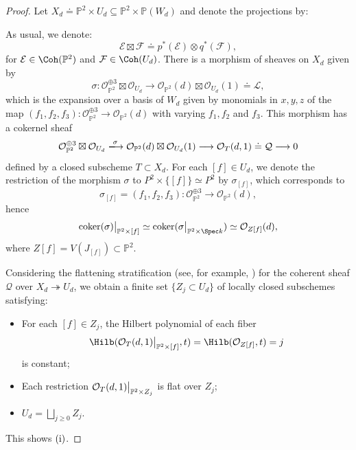 \documentclass[11pt]{amsart} %
\newcommand\restr[2]{{%
  \left.\kern-\nulldelimiterspace %
  #1 %
  \vphantom{\big|} %
  \right|_{#2} %
}}
\newcommand{\lar}{\longrightarrow}
\theoremstyle{definition}
\def\coker{\mbox{\rm coker}}
\begin{document}
\begin{proof}
Let $X_d \doteq \mathbb{P}^2 \times U_d \subseteq \mathbb{P}^2 \times \mathbb{P}(W_d)$ and denote the projections by:
\begin{center}
\end{center}
As usual, we denote:
$$
\mathcal{E} \boxtimes \mathcal{F} \doteq p^*( \mathcal{E}) \otimes q^*( \mathcal{F} ),
$$
for $\mathcal{E} \in \Coh(\mathbb{P}^2)$ and $\mathcal{F} \in \Coh(U_d)$. There is a morphism of sheaves on $X_d$ given by
$$
\sigma : \mathcal{O}_{\mathbb{P}^2}^{\oplus 3} \boxtimes \mathcal{O}_{U_d} \rightarrow \mathcal{O}_{\mathbb{P}^2}(d) \boxtimes \mathcal{O}_{U_d}(1) \doteq \mathcal{L},
$$
which is the expansion over a basis of $W_d$ given by monomials in $x,y,z$ of the map 
$
(f_1, f_2, f_3): \mathcal{O}_{\mathbb{P}^2}^{\oplus 3} \lar \mathcal{O}_{\mathbb{P}^2}(d)
$ with varying $f_1, f_2$ and $f_3$. This morphism has a cokernel sheaf
$$
\mathcal{O}_{\mathbb{P}^2}^{\oplus 3} \boxtimes \mathcal{O}_{U_d} \xlongrightarrow{\sigma} \mathcal{O}_{\mathbb{P}^2}(d) \boxtimes \mathcal{O}_{U_d}(1) \lar \mathcal{O}_T(d,1) \doteq \mathcal{Q} \lar 0
$$
defined by a closed subscheme $T \subset X_d$. For each $[f] \in U_d$, we denote the restriction of the morphism $\sigma$ to $P^2 \times \{[f]\} \simeq P^2$ by $\sigma_{[f]}$, which corresponds to 
$$
\sigma_{[f]} = (f_1,f_2,f_3):\mathcal{O}_{\mathbb{P}^2}^{\oplus 3} \lar \mathcal{O}_{\mathbb{P}^2}(d),
$$
hence
$$
\restr {\coker(\sigma)} {\mathbb{P}^2 \times {[f]}} \simeq \coker(\restr {\sigma} {\mathbb{P}^2 \times \Spec k}) \simeq \mathcal{O}_{Z[f]}(d),
$$
where $Z[f] = V(J_{[f]}) \subset \mathbb{P}^2$.

Considering the flattening stratification (see, for example, \cite[Chapter 8]{mumford1966lectures}) for the coherent sheaf $\mathcal{Q}$ over $X_d \twoheadrightarrow U_d$, we obtain a finite set $\{Z_j \subset U_d\}$ of locally closed subschemes satisfying:
\begin{itemize}
    \item[(a)] For each $[f] \in Z_j$, the Hilbert polynomial of each fiber 
    $$
    \Hilb(\restr {\mathcal{O}_T(d,1)} {\mathbb{P}^2 \times [f]}, t) = \Hilb(\mathcal{O}_{Z[f]}, t) = j
    $$
    is constant;
    \item[(b)] Each restriction $\restr {\mathcal{O}_T(d,1)} {\mathbb{P}^2 \times Z_j}$ is flat over $Z_j$;
    \item[(c)] $U_d = \bigsqcup_{j \geq 0} Z_j$.
\end{itemize}
This shows ${\rm (i)}$.


\end{proof}
\end{document}

